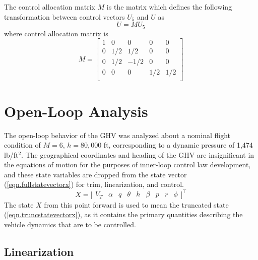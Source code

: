 The control allocation matrix $M$ is the matrix which defines the following transformation between control vectors $U_{5}$ and $U$ as
\begin{equation*}
  U = MU_{5}
\end{equation*}
where control allocation matrix is
\begin{equation*}
  M=
  \left[
  \begin{array}{ccccc}
    1 & 0 & 0 & 0 & 0 \\
    0 & 1/2 & 1/2 & 0 & 0 \\
    0 & 1/2 & -1/2 & 0 & 0 \\
    0 & 0 & 0 & 1/2 & 1/2 \\
  \end{array}\right]
\end{equation*}


\section{Open-Loop Analysis}

The open-loop behavior of the GHV was analyzed about a nominal flight condition of $M=6$, $h=80,000$ ft, corresponding to a dynamic pressure of 1,474 lb/ft$^2$.
The geographical coordinates and heading of the GHV are insignificant in the equations of motion for the purposes of inner-loop control law development, and these state variables are dropped from the state vector (\ref{eqn.fullstatevectorx}) for trim, linearization, and control.
\begin{equation}
  \label{eqn.truncstatevectorx}
  X=\bigr[
  \begin{array}{ccccccccc}
    V_{T} &  \alpha & q &\theta & h & \beta &p & r & \phi
  \end{array}\bigr]^{\top}
\end{equation}
The state $X$ from this point forward is used to mean the truncated state (\ref{eqn.truncstatevectorx}), as it contains the primary quantities describing the vehicle dynamics that are to be controlled.

\subsection{Linearization}

